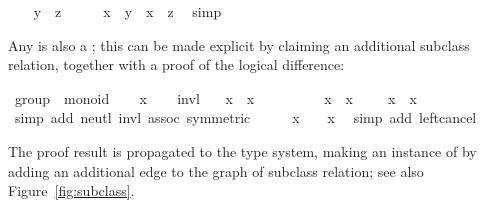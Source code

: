 \begin{isabellebody}
\isamarkupfalse%
\isanewline
\ \ \isamarkupfalse%
\ {\isachardoublequoteopen}y\ {\isacharequal}\ z{\isachardoublequoteclose}\isanewline
\ \ \isamarkupfalse%
\ \isamarkupfalse%
\ {\isachardoublequoteopen}x\ {\isasymoplus}\ y\ {\isacharequal}\ x\ {\isasymoplus}\ z{\isachardoublequoteclose}\ \isamarkupfalse%
\ simp\isanewline
{}\isamarkupfalse%
%
\endisatagproof
{\isafoldproof}%
%
\isadelimproof
%
\endisadelimproof
%
\begin{isamarkuptext}%
\noindent Any  is also a ; this
can be made explicit by claiming an additional subclass relation,
together with a proof of the logical difference:%
\end{isamarkuptext}%
\isamarkuptrue%
\isamarkupfalse%
\ group\ {\isasymsubseteq}\ monoid\isanewline
%
\isadelimproof
%
\endisadelimproof
%
\isatagproof
{}\isamarkupfalse%
\isanewline
\ \ \isamarkupfalse%
\ x\isanewline
\ \ \isamarkupfalse%
\ invl\ \isamarkupfalse%
\ {\isachardoublequoteopen}{\isasymdiv}\ x\ {\isasymoplus}\ x\ {\isacharequal}\ {\isasymzero}{\isachardoublequoteclose}\ \isacommand{{\isachardot}}\isamarkupfalse%
\isanewline
\ \ \isamarkupfalse%
\ \isamarkupfalse%
\ {\isachardoublequoteopen}{\isasymdiv}\ x\ {\isasymoplus}\ {\isacharparenleft}x\ {\isasymoplus}\ {\isasymzero}{\isacharparenright}\ {\isacharequal}\ {\isasymdiv}\ x\ {\isasymoplus}\ x{\isachardoublequoteclose}\isanewline
\ \ \ \ \isamarkupfalse%
\ {\isacharparenleft}simp\ add{\isacharcolon}\ neutl\ invl\ assoc\ {\isacharbrackleft}symmetric{\isacharbrackright}{\isacharparenright}\isanewline
\ \ \isamarkupfalse%
\ \isamarkupfalse%
\ {\isachardoublequoteopen}x\ {\isasymoplus}\ {\isasymzero}\ {\isacharequal}\ x{\isachardoublequoteclose}\ \isamarkupfalse%
\ {\isacharparenleft}simp\ add{\isacharcolon}\ left{\isacharunderscore}cancel{\isacharparenright}\isanewline
{}\isamarkupfalse%
%
\endisatagproof
{\isafoldproof}%
%
\isadelimproof
%
\endisadelimproof
%
\begin{isamarkuptext}%
\noindent The proof result is propagated to the type system,
making  an instance of  by adding an
additional edge to the graph of subclass relation; see also
Figure~\ref{fig:subclass}.


\end{isamarkuptext}
\end{isabellebody}
